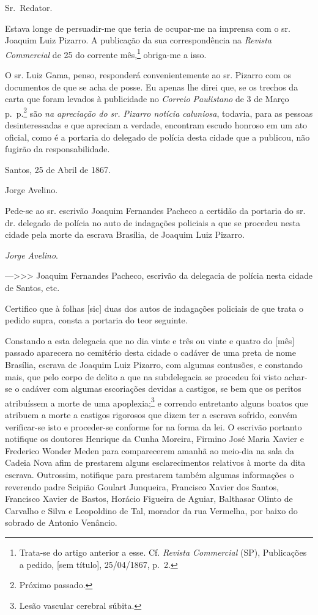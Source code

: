 \textbf{\asterisc{}}

Sr.~Redator.

Estava longe de persuadir-me que teria de ocupar-me na imprensa com o
sr. Joaquim Luiz Pizarro. A publicação da sua correspondência na
\emph{Revista Commercial} de 25 do corrente mês,\footnote{ Trata-se
  do artigo anterior a esse. Cf. \emph{Revista Commercial} (SP),
  Publicações a pedido, {[}sem título{]}, 25/04/1867, p.~2.} obriga-me a
isso.

O sr. Luiz Gama, penso, responderá convenientemente ao sr. Pizarro com
os documentos de que se acha de posse. Eu apenas lhe direi que, se os
trechos da carta que foram levados à publicidade no \emph{Correio
Paulistano} de 3 de Março p.~p.\textsuperscript{⁠}\footnote{ Próximo
  passado.} são \emph{na apreciação do sr. Pizarro notícia caluniosa},
todavia, para as pessoas desinteressadas e que apreciam a verdade,
encontram escudo honroso em um ato oficial, como é a portaria do
delegado de polícia desta cidade que a publicou, não fugirão da
responsabilidade.

Santos, 25 de Abril de 1867.

Jorge Avelino.

Pede-se ao sr. escrivão Joaquim Fernandes Pacheco a certidão da portaria
do sr. dr. delegado de polícia no auto de indagações policiais a que se
procedeu nesta cidade pela morte da escrava Brasília, de Joaquim Luiz
Pizarro.

\emph{Jorge Avelino}.

---\textgreater\textgreater\textgreater{} Joaquim Fernandes Pacheco,
escrivão da delegacia de polícia nesta cidade de Santos, etc.

Certifico que à folhas {[}sic{]} duas dos autos de indagações policiais
de que trata o pedido supra, consta a portaria do teor seguinte.

Constando a esta delegacia que no dia vinte e três ou vinte e quatro do
{[}mês{]} passado aparecera no cemitério desta cidade o cadáver de uma
preta de nome Brasília, escrava de Joaquim Luiz Pizarro, com algumas
contusões, e constando mais, que pelo corpo de delito a que na
subdelegacia se procedeu foi visto achar-se o cadáver com algumas
escoriações devidas a castigos, se bem que os peritos atribuíssem a
morte de uma apoplexia;\footnote{ Lesão vascular cerebral súbita.} e
correndo entretanto alguns boatos que atribuem a morte a castigos
rigorosos que dizem ter a escrava sofrido, convém verificar-se isto e
proceder-se conforme for na forma da lei. O escrivão portanto notifique
os doutores Henrique da Cunha Moreira, Firmino José Maria Xavier e
Frederico Wonder Meden para comparecerem amanhã ao meio-dia na sala da
Cadeia Nova afim de prestarem alguns esclarecimentos relativos à morte
da dita escrava. Outrossim, notifique para prestarem também algumas
informações o reverendo padre Scipião Goulart Junqueira, Francisco
Xavier dos Santos, Francisco Xavier de Bastos, Horácio Figueira de
Aguiar, Balthasar Olinto de Carvalho e Silva e Leopoldino de Tal,
morador da rua Vermelha, por baixo do sobrado de Antonio Venâncio.

